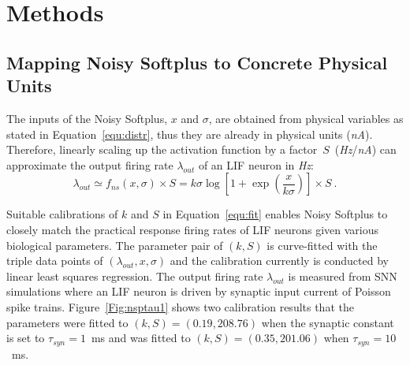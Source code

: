 \documentclass{article}
\begin{document}
	
	\section{Methods}	
	\label{sec:meth}
	
	\subsection{Mapping Noisy Softplus to Concrete Physical Units}
	\label{sec:af_model}
	The inputs of the Noisy Softplus, $x$ and $\sigma$, are obtained from physical variables as stated in Equation~\ref{equ:distr}, thus they are already in physical units (\textit{nA}).
	Therefore, linearly scaling up the activation function by a factor~$S$~(\textit{Hz}/\textit{nA}) can approximate the output firing rate $\lambda_{out}$ of an LIF neuron in \textit{Hz}:
	\begin{equation}
	\lambda_{out} \simeq f_{ns}(x, \sigma) \times S = k \sigma \log [1 + \exp(\frac{x}{k \sigma})] \times S~.
	\label{equ:fit}
	\end{equation}	
	
	
	Suitable calibrations of $k$ and $S$ in Equation~\ref{equ:fit} enables Noisy Softplus to closely match the practical response firing rates of LIF neurons given various biological parameters.
	The parameter pair of $(k, S)$ is curve-fitted with the triple data points of $(\lambda_{out}, x, \sigma)$ and the calibration currently is conducted by linear least squares regression.
	The output firing rate $\lambda_{out}$ is measured from SNN simulations where an LIF neuron is driven by synaptic input current of Poisson spike trains.
	Figure~\ref{Fig:nsptau1} shows two calibration results that 
	the parameters were fitted to $(k, S)=(0.19,208.76)$ when the synaptic constant is set to $\tau_{syn}=1$~ms and was fitted to $(k, S)=(0.35,201.06)$ when $\tau_{syn}=10$~ms.
	
\end{document}
